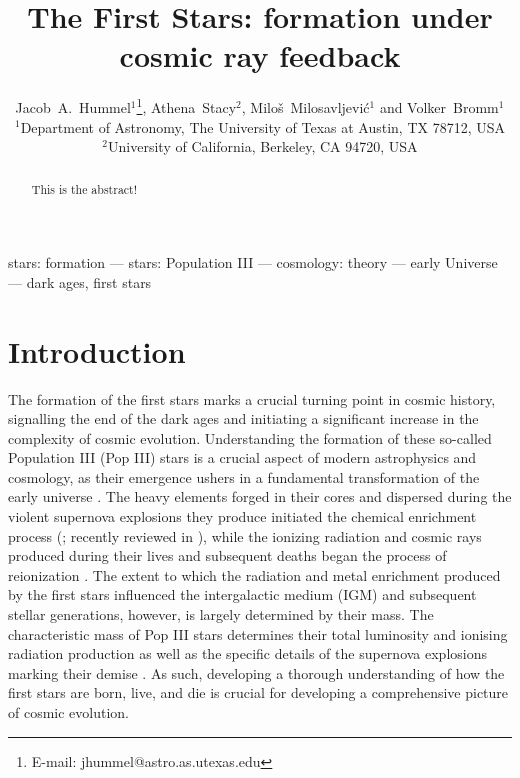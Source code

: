 \documentclass[useAMS,usenatbib]{mn2e}
\title[First stars under cosmic ray feedback]{The First Stars: formation under cosmic ray feedback}
\author[J.~A. Hummel et al.]
{Jacob~A.~Hummel$^1$\thanks{E-mail: jhummel@astro.as.utexas.edu},
  Athena~Stacy$^2$, Milo\v s~Milosavljevi\'c$^1$ and Volker~Bromm$^1$\\
$^1$Department of Astronomy, The University of Texas at Austin, TX 78712, USA\\
$^2$University of California, Berkeley, CA 94720, USA
 }
\begin{document}
\label{firstpage}

\maketitle
\topmargin-1cm


\begin{abstract}
This is the abstract!
\end{abstract}


\begin{keywords}
stars: formation --- stars: Population III --- cosmology: theory --- early Universe --- dark ages, first stars

\end{keywords}


\section{Introduction}
\label{intro}

The formation of the first stars marks a crucial turning point in cosmic history, signalling the end of the dark ages and initiating a significant increase in the complexity of cosmic evolution.  Understanding the formation of these so-called Population III (Pop III) stars is a crucial aspect of modern astrophysics and cosmology, as their emergence ushers in a fundamental transformation of the early universe \citep{BarkanaLoeb2001,Miralda-Escude2003,Brommetal2009,Loeb2010, Bromm2013}. The heavy elements forged in their cores and dispersed during the violent supernova explosions they produce initiated the chemical enrichment process (\citealt{MadauFerraraRees2001, MoriFerraraMadau2002, BrommYoshidaHernquist2003, Hegeretal2003, UmedaNomoto2003, TornatoreFerraraSchneider2007, Greifetal2007, Greifetal2010, WiseAbel2008, Maioetal2011}; recently reviewed in \citealt{KarlssonBrommHawthorn2013}), while the ionizing radiation and cosmic rays produced during their lives and subsequent deaths began the process of reionization \citep{Kitayamaetal2004, Sokasianetal2004, WhalenAbelNorman2004, AlvarezBrommShapiro2006, JohnsonGreifBromm2007, Robertsonetal2010}.  The extent to which the radiation and metal enrichment produced by the first stars influenced the intergalactic medium (IGM) and subsequent stellar generations, however, is largely determined by their mass.  The characteristic mass of Pop III stars determines their total luminosity and ionising radiation production \citep{Schaerer2002} as well as the specific details of the supernova explosions marking their demise \citep{Hegeretal2003, HegerWoosley2010, MaederMeynet2012}. As such, developing a thorough understanding of how the first stars are born, live, and die is crucial for developing a comprehensive picture of cosmic evolution.
\end{document}
